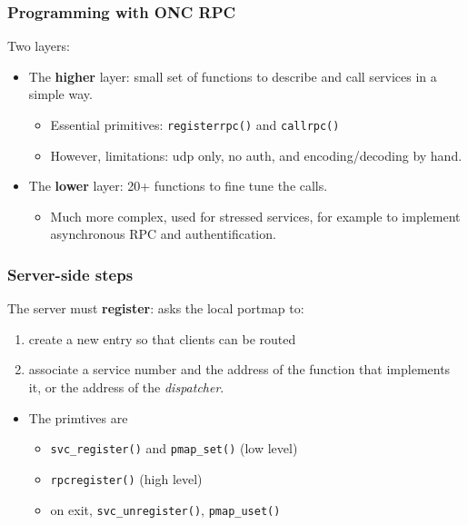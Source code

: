 \documentclass[bigger,hyperref={colorlinks=true, urlcolor=red, plainpages=false, pdfpagelabels, bookmarksnumbered}]{beamer}
\begin{document}
\begin{frame}
\frametitle{Programming with ONC RPC}
\label{sec-2-8}

   Two layers:
\begin{itemize}

\item The \textbf{higher} layer: small set of functions to describe and call services in a simple way.
\label{sec-2-8-1}%
\begin{itemize}
\item Essential primitives: \texttt{registerrpc()} and \texttt{callrpc()} \\
\item However, limitations: udp only, no auth, and encoding/decoding by hand.
\end{itemize}


\item The \textbf{lower} layer: 20+ functions to fine tune the calls.
\label{sec-2-8-2}%
\begin{itemize}
\item Much more complex, used for stressed services, for example 
     to implement asynchronous RPC and authentification.
\end{itemize}

\end{itemize} %
\end{frame}
\begin{frame}
\frametitle{Server-side steps}
\label{sec-2-9}

   The server must \textbf{register}: asks the local portmap to:
\begin{enumerate}
\item create a new entry so that clients can be routed
\item associate a service number and the address of the function 
     that implements it, or the address of the \emph{dispatcher}.
\end{enumerate}
\begin{itemize}

\item The primtives are
\label{sec-2-9-1}%
\begin{itemize}
\item \texttt{svc\_register()} and \texttt{pmap\_set()} (low level)
\item \texttt{rpcregister()} (high level)
\item on exit, \texttt{svc\_unregister()}, \texttt{pmap\_uset()}
\end{itemize}
\end{itemize} %
\end{frame}
\end{document}
